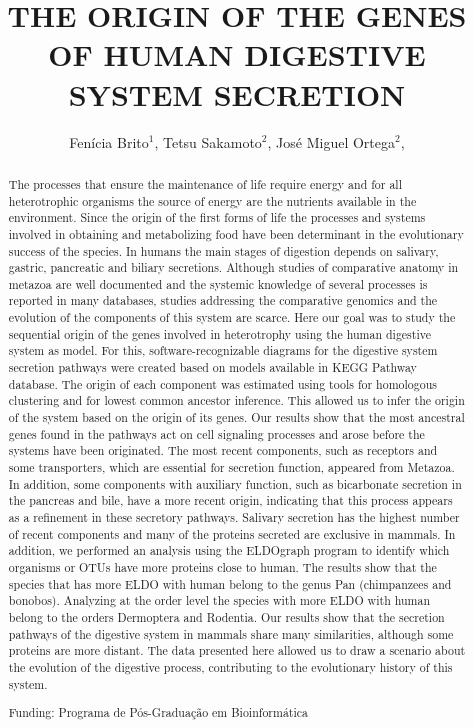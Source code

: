 \documentclass[twoside]{article}
\title{\vspace{-15mm}\fontsize{24pt}{10pt}\selectfont\textbf{ THE ORIGIN OF THE GENES OF HUMAN DIGESTIVE SYSTEM SECRETION }} %
\author{ Fenícia Brito$^{1}$, Tetsu Sakamoto$^{2}$, José Miguel Ortega$^{2}$, }
\affil{ 1 UFMG

2 Universidade Federal de Minas Gerais Laboratório de Biodados

 }
\date{}
\begin{document}
  
  
  \maketitle %
  
  
  \thispagestyle{fancy} %
  
  
  \begin{abstract}
  The processes that ensure the maintenance of life require energy and for all heterotrophic organisms the source of energy are the nutrients available in the environment. Since the origin of the first forms of life the processes and systems involved in obtaining and metabolizing food have been determinant in the evolutionary success of the species. In humans the main stages of digestion depends on salivary, gastric, pancreatic and biliary secretions. Although studies of comparative anatomy in metazoa are well documented and the systemic knowledge of several processes is reported in many databases, studies addressing the comparative genomics and the evolution of the components of this system are scarce. Here our goal was to study the sequential origin of the genes involved in heterotrophy using the human digestive system as model. For this, software-recognizable diagrams for the digestive system secretion pathways were created based on models available in KEGG Pathway database. The origin of each component was estimated using tools for homologous clustering and for lowest common ancestor inference. This allowed us to infer the origin of the system based on the origin of its genes. Our results show that the most ancestral genes found in the pathways act on cell signaling processes and arose before the systems have been originated. The most recent components, such as receptors and some transporters, which are essential for secretion function, appeared from Metazoa. In addition, some components with auxiliary function, such as bicarbonate secretion in the pancreas and bile, have a more recent origin, indicating that this process appears as a refinement in these secretory pathways. Salivary secretion has the highest number of recent components and many of the proteins secreted are exclusive in mammals. In addition, we performed an analysis using the ELDOgraph program to identify which organisms or OTUs have more proteins close to human. The results show that the species that has more ELDO with human belong to the genus Pan (chimpanzees and bonobos). Analyzing at the order level the species with more ELDO with human belong to the orders Dermoptera and Rodentia. Our results show that the secretion pathways of the digestive system in mammals share many similarities, although some proteins are more distant. The data presented here allowed us to draw a scenario about the evolution of the digestive process, contributing to the evolutionary history of this system.
  
  Funding: Programa de P\'os-Gradua\c{c}\~ao em Bioinform\'atica \\ 
  \end{abstract}
  
\end{document}
